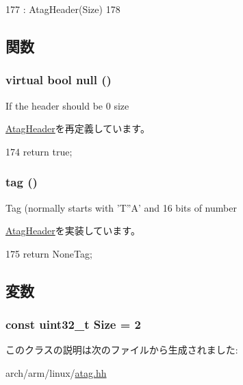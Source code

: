 \begin{DoxyCode}
177         : AtagHeader(Size)
178     {}
\end{DoxyCode}


\subsection{関数}
\hypertarget{classAtagNone_a4af1ca4124e0ed6600fa7b8093eba309}{
\subsubsection[{null}]{\setlength{\rightskip}{0pt plus 5cm}virtual bool null ()}}
\label{classAtagNone_a4af1ca4124e0ed6600fa7b8093eba309}
If the header should be 0 size 

\hyperlink{classAtagHeader_a4af1ca4124e0ed6600fa7b8093eba309}{AtagHeader}を再定義しています。


\begin{DoxyCode}
174 { return true; }
\end{DoxyCode}
\hypertarget{classAtagNone_afe29fbb80b1d2765e37e98c6d259ea52}{
\subsubsection[{tag}]{ tag ()}}
\label{classAtagNone_afe29fbb80b1d2765e37e98c6d259ea52}
Tag (normally starts with 'T''A' and 16 bits of number 

\hyperlink{classAtagHeader_adad80b4c3e973afddab9e70f05faecd9}{AtagHeader}を実装しています。


\begin{DoxyCode}
175 { return NoneTag; }
\end{DoxyCode}


\subsection{変数}
\hypertarget{classAtagNone_a7ecea14dd0f3277e19580d4509fafdba}{
\subsubsection[{Size}]{\setlength{\rightskip}{0pt plus 5cm}const {\bf uint32\_\-t} {\bf Size} = 2}}
\label{classAtagNone_a7ecea14dd0f3277e19580d4509fafdba}


このクラスの説明は次のファイルから生成されました:\begin{DoxyCompactItemize}
\item 
arch/arm/linux/\hyperlink{atag_8hh}{atag.hh}\end{DoxyCompactItemize}
